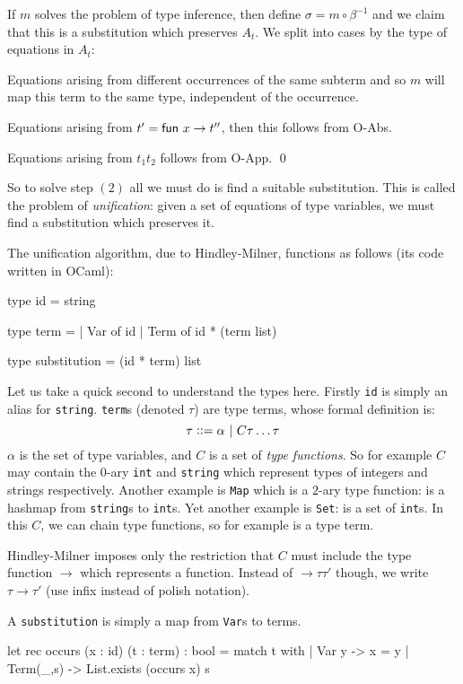 If $m$ solves the problem of type inference, then define $\sigma=m\circ\beta^{-1}$ and we claim that this is a substitution which preserves $A_t$.
We split into cases by the type of equations in $A_t$:
\benum
    \item Equations arising from different occurrences of the same subterm and so $m$ will map this term to the same type, independent of the occurrence.
    \item Equations arising from $t'=\fun x\to t''$, then this follows from {\tensc O-Abs}.
    \item Equations arising from $t_1t_2$ follows from {\tensc O-App}.
    \qed
\eenum

So to solve step $(2)$ all we must do is find a suitable substitution.
This is called the problem of {\it unification}: given a set of equations of type variables, we must find a substitution which preserves it.

The unification algorithm, due to Hindley-Milner, functions as follows (its code written in OCaml):

\beginhi \color{white} \globcounttrue
type id = string

type term =
    | Var of id
    | Term of id * (term list)

type substitution = (id * term) list
\endhi

Let us take a quick second to understand the types here.
Firstly {\tt id} is simply an alias for {\tt string}.
{\tt term}s (denoted $\tau$) are type terms, whose formal definition is:
$$ \tau \ccoloneqq \alpha\ |\ C\tau\dots\tau $$
$\alpha$ is the set of type variables, and $C$ is a set of {\it type functions}.
So for example $C$ may contain the $0$-ary {\tt int} and {\tt string} which represent types of integers and strings respectively.
Another example is {\tt Map} which is a $2$-ary type function:  is a hashmap from {\tt string}s to {\tt int}s.
Yet another example is {\tt Set}:  is a set of {\tt int}s.
In this $C$, we can chain type functions, so for example  is a type term.

Hindley-Milner imposes only the restriction that $C$ must include the type function $\to$ which represents a function.
Instead of $\to \tau \tau'$ though, we write $\tau\to\tau'$ (use infix instead of polish notation).

A {\tt substitution} is simply a map from {\tt Var}s to terms.

\beginhi \color{white} \globcounttrue
let rec occurs (x : id) (t : term) : bool =
    match t with
    | Var y -> x = y
    | Term(_,s) -> List.exists (occurs x) s
\endhi


